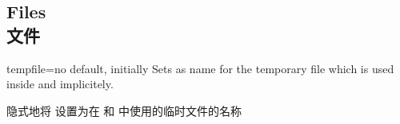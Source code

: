 \subsection{Files\\文件}
\begin{docTcbKey}{tempfile}{=}{no default, initially }
Sets  as name for the temporary file which is used inside
 and  implicitely.

隐式地将   设置为在  和  中使用的临时文件的名称
\end{docTcbKey}









 

 
